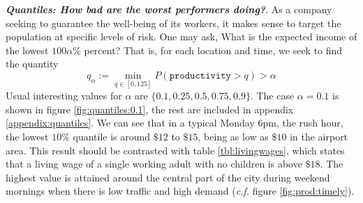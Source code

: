 \documentclass[11pt]{article}
\begin{document}
{\bfseries\itshape Quantiles: How bad are the worst performers doing?}. As a company seeking to guarantee the well-being of its workers, it makes sense to target the population at specific levels of risk. One may ask, What is the expected income of the lowest $100 \alpha\%$ percent? That is, for each location and time, we seek to find the quantity
$$
q_\alpha := \min_{q\in[0,125]}P(\mathtt{productivity} > q) > \alpha
$$
Usual interesting values for $\alpha$ are $\{0.1, 0.25, 0.5, 0.75, 0.9\}$. The case $\alpha = 0.1$ is shown in figure \ref{fig:quantiles:0.1}, the rest are included in appendix \ref{appendix:quantiles}. We can see that in a typical Monday 6pm, the rush hour, the lowest $10\%$ quantile is around $\$12$ to $\$15$, being as low as $\$10$ in the airport area. This result should be contrasted with table \ref{tbl:livingwages}, which states that a living wage of a single working adult with no children is above $\$18$. The highest value is attained around the central part of the city during weekend mornings when there is low traffic and high demand (\textit{c.f.} figure \ref{fig:prod:timely}).
\end{document}
